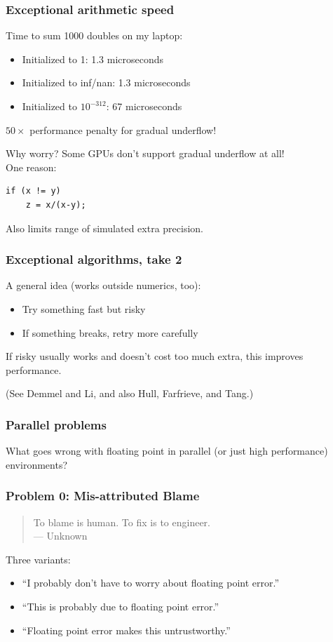 \documentclass{beamer}
\begin{document}
\begin{frame}[fragile]
  \frametitle{Exceptional arithmetic speed}

  Time to sum 1000 doubles on my laptop:
  \begin{itemize}
  \item Initialized to 1: 1.3 microseconds
  \item Initialized to inf/nan: 1.3 microseconds
  \item Initialized to $10^{-312}$: 67 microseconds
  \end{itemize}
  $50 \times$ performance penalty for gradual underflow!

  \vspace{5mm}
  Why worry?  Some GPUs don't support gradual underflow
  at all! \\
One reason:
\begin{lstlisting}
if (x != y)
    z = x/(x-y);
\end{lstlisting}

Also limits range of simulated extra precision.

\end{frame}


\begin{frame}
  \frametitle{Exceptional algorithms, take 2}

  A general idea (works outside numerics, too):
  \begin{itemize}
  \item Try something fast but risky
  \item If something breaks, retry more carefully
  \end{itemize}
  If risky usually works and doesn't cost too much extra,
  this improves performance.

  \vspace{1cm}
  (See Demmel and Li, and also Hull, Farfrieve, and Tang.)

\end{frame}


\begin{frame}
  \frametitle{Parallel problems}
  
  What goes wrong with floating point in parallel (or just high performance)
  environments?
\end{frame}


\begin{frame}
  \frametitle{Problem 0: Mis-attributed Blame}

  \begin{quote}
    To blame is human.  To fix is to engineer. \\ \hfill --- Unknown
  \end{quote}
  
  Three variants:
  \begin{itemize}
  \item ``I probably don't have to worry about floating point error.''
  \item ``This is probably due to floating point error.''
  \item ``Floating point error makes this untrustworthy.''
  \end{itemize}
\end{frame}
\end{document}
